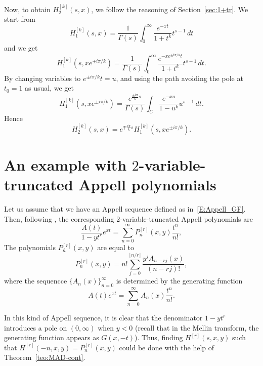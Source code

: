 \documentclass[11pt,a4paper]{amsart}
\theoremstyle{plain}
\theoremstyle{plain}
\theoremstyle{remark}
\numberwithin{equation}{section}
\begin{document}
Now, to obtain $H_2^{[k]}(s,x)$, we follow the reasoning of Section~\ref{sec:1+tr}. We start from
\[
  H_1^{[k]}(s,x) = \frac{1}{\Gamma(s)} \int_{0}^{\infty} \frac{e^{-xt}}{1+t^k} t^{s-1} \,dt
\]
and we get
\[
  H_1^{[k]}(s,xe^{\pm i\pi/k}) = \frac{1}{\Gamma(s)}
  \int_{0}^{\infty} \frac{e^{-xe^{\pm i\pi/k}t}}{1+t^k} t^{s-1} \,dt.
\]
By changing variables to $e^{\pm i\pi/k}t=u$, and using the path avoiding the pole at $t_0=1$ as usual, we get
\[
  H_1^{[k]}(s,xe^{\pm i\pi/k}) = \frac{e^{\frac{\pm i\pi}{k}s}}{\Gamma(s)}
  \int_{C} \frac{e^{-xu}}{1-u^k} u^{s-1} \,dt.
\]
Hence
\[
  H_2^{[k]}(s,x) = e^{\mp \frac{i\pi}{k}s} H_1^{[k]}(s,xe^{\pm i\pi/k}).
\]

\section{An example with $2$-variable-truncated Appell polynomials}
\label{sec:truncated}

Let us assume that we have an Appell sequence defined as in~\eqref{E:Appell_GF}.
Then, following \cite[\S\,2]{KYA17}, the corresponding $2$-variable-truncated Appell polynomials are
\begin{equation}
\label{eq:truncated}
  \frac{A(t)}{1-yt^r} e^{xt} = \sum_{n=0}^\infty P^{[r]}_{n}(x,y)\frac{t^n}{n!},
\end{equation}
The polynomials $P^{[r]}_{n}(x,y)$ are equal to
\[
  P_n^{[r]}(x,y) = n!\sum_{j=0}^{\lfloor {n}/{r} \rfloor} \frac{y^jA_{n-rj}(x)}{(n-rj)!},
\]
where the sequencce $\{A_n(x)\}_{n=0}^{\infty}$ is determined by the generating function
\begin{equation*}
  A(t) e^{xt} = \sum_{n=0}^\infty A_n(x)\frac{t^n}{n!}.
\end{equation*}


In this kind of Appell sequence, it is clear that the denominator $1-yt^r$ introduces a pole on $(0,\infty)$ when $y < 0$ (recall that in the Mellin transform, the generating function appears as $G(x,-t)$). Thus, finding $H^{[r]}(s,x,y)$ such that $H^{[r]}(-n,x,y) = P_n^{[r]}(x,y)$ could be done with the help of Theorem~\ref{teo:MAD-cont}.
\end{document}
